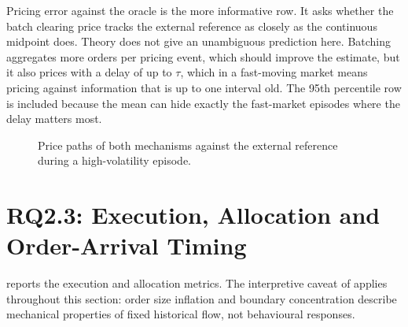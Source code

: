 Pricing error against the oracle is the more informative row. It asks
whether the batch clearing price tracks the external reference as
closely as the continuous midpoint does. Theory does not give an
unambiguous prediction here. Batching aggregates more orders per pricing
event, which should improve the estimate, but it also prices with a
delay of up to $\tau$, which in a fast-moving market means pricing
against information that is up to one interval old. The 95th percentile
row is included because the mean can hide exactly the fast-market
episodes where the delay matters most.

\begin{figure}[htbp]
\centering
{}
\caption[Price paths against the oracle reference]{Price paths of both
mechanisms against the external reference during a high-volatility
episode.}
\label{fig:pricepaths}
\end{figure}

\section{RQ2.3: Execution, Allocation and Order-Arrival Timing}
\label{sec:res23}

 reports the execution and allocation metrics. The
interpretive caveat of  applies throughout this
section: order size inflation and boundary concentration describe
mechanical properties of fixed historical flow, not behavioural
responses.

